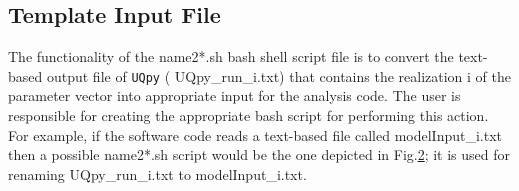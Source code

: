 \begin{figure}[!ht]
	\caption{}
	\label{template_mcs}
\end{figure}



\subsection{Template Input File}

The functionality of the {\color{red} name2*.sh} bash shell script file is to convert the text-based output file of \texttt{UQpy}   ({\color{magenta} UQpy\_run\_i.txt}) that contains the realization {\color{magenta} i}  of the parameter vector into appropriate input  for the analysis code.  The user is responsible for creating the appropriate bash script for performing this action. For example, if the software code reads a text-based  file called {\color{magenta} modelInput\_i.txt} then a possible {\color{red} name2*.sh} script would be the one depicted in Fig.\ref{template_input};  it is used for renaming {\color{magenta} UQpy\_run\_i.txt } to {\color{magenta} modelInput\_i.txt}.


\begin{figure}[!ht]
	\caption{}
	\label{template_input}
\end{figure}



